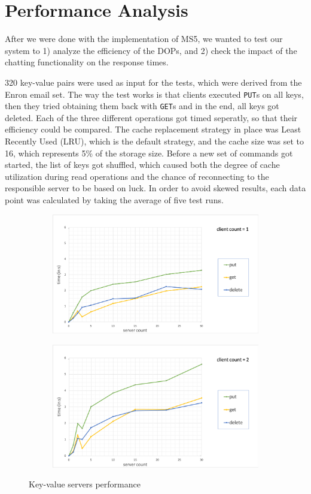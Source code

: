 \section{Performance Analysis}
\label{sec:perf}

After we were done with the implementation of MS5, we wanted to test our system to 1) analyze the efficiency of the DOPs, and 2) check the impact of the chatting functionality on the response times.

320 key-value pairs were used as input for the tests, which were derived from the Enron email set. The way the test works is that clients executed \texttt{PUT}s on all keys, then they tried obtaining them back with \texttt{GET}s and in the end, all keys got deleted. Each of the three different operations got timed seperatly, so that their efficiency could be compared. The cache replacement strategy in place was Least Recently Used (LRU), which is the default strategy, and the cache size was set to 16, which represents 5\% of the storage size. Before a new set of commands got started, the list of keys got shuffled, which caused both the degree of cache utilization during read operations and the chance of reconnecting to the responsible server to be based on luck.
In order to avoid skewed results, each data point was calculated by taking the average of five test runs.

\begin{figure}
	\begin{subfigure}[b]{\linewidth}
	\centering
	\includegraphics[width=0.8\linewidth]{figures/performance/cc1.png}
\caption{}
\label{fig:perf_cc1}
	\end{subfigure}
	\begin{subfigure}[b]{\linewidth}
	\centering
	\includegraphics[width=0.8\linewidth]{figures/performance/cc2.png}
\caption{}
\label{fig:perf_cc2}
	\end{subfigure}
\caption{Key-value servers performance}
\label{fig:perf_cc}
\end{figure}

